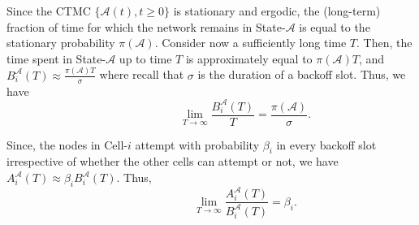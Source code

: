 \documentclass[10pt,a4paper,journal]{IEEEtran}
\theoremstyle{definition}
\theoremstyle{remark}
\theoremstyle{plain}
\begin{document}
Since the CTMC $\{\mathcal{A}(t), t \geq 0\}$ is stationary and
ergodic, the (long-term) fraction of time for which the network
remains in State-$\mathcal{A}$ is equal to the stationary probability
$\pi(\mathcal{A})$. Consider now a sufficiently long time $T$. Then,
the time spent in State-$\mathcal{A}$ up to time $T$ is approximately
equal to $\pi(\mathcal{A})T$, and $B_i^{\mathcal{A}}(T) \approx
\displaystyle \frac{\pi(\mathcal{A}) T}{\sigma}$ where recall that
$\sigma$ is the duration of a backoff slot. Thus, we have 
\begin{equation}
\label{eqn:number-of-backoff-slots}
\quad \quad \quad \quad \quad \quad \displaystyle \lim_{T \longrightarrow \infty} \frac{B_i^{\mathcal{A}}(T)}{T} = \frac{\pi(\mathcal{A})}{\sigma}. 
\end{equation}

Since, the nodes in Cell-$i$ attempt with probability $\beta_i$ in
every backoff slot irrespective of whether the other cells can attempt
or not, we have $A_i^{\mathcal{A}}(T) \approx \beta_i
B_i^{\mathcal{A}}(T)$. Thus, 
\begin{equation}
\label{eqn:beta-definition}
\quad \quad \quad \quad \quad \quad \displaystyle \lim_{T \longrightarrow \infty} \frac{A_i^{\mathcal{A}}(T)}{B_i^{\mathcal{A}}(T)} = \beta_i. 
\end{equation}
\end{document}

